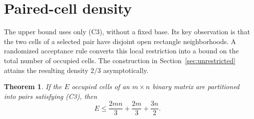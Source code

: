 \documentclass[11pt]{article}
\newtheorem{theorem}{Theorem}
\begin{document}
\section{Paired-cell density}\label{sec:density}\label{sec:paireddensity}
The upper bound uses only (C3), without a fixed base. Its key observation
is that the two cells of a selected pair have disjoint open rectangle
neighborhoods. A randomized acceptance rule converts this local
restriction into a bound on the total number of occupied cells.
The construction in Section~\ref{sec:unrestricted} attains the resulting
density $2/3$ asymptotically.

\begin{theorem}\label{thm:paireddensity}
If the $E$ occupied cells of an $m\times n$ binary matrix are partitioned
into pairs satisfying \textup{(C3)}, then
\[
 E\le\frac{2mn}{3}+\frac{2m}{3}+\frac{3n}{2}.
\]
\end{theorem}
\end{document}
